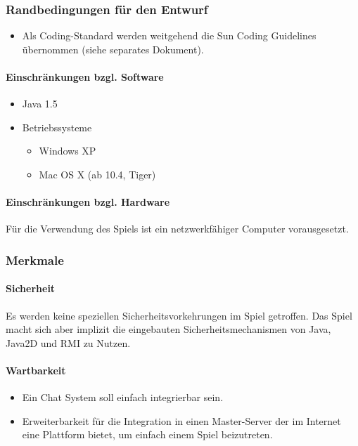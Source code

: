 \documentclass[a4paper,12pt,halfparskip,DIV14]{scrartcl}
\begin{document}
\subsubsection{Randbedingungen für den Entwurf}\label{ssub:randbedingungen_für_den_entwurf} %
\begin{itemize}
	\item Als Coding-Standard werden weitgehend die Sun Coding Guidelines übernommen (siehe separates Dokument).
\end{itemize}
\paragraph{Einschränkungen bzgl. Software}\label{ssub:einschränkungen_bzgl_software} %
\begin{itemize}
	\item Java 1.5
	\item Betriebssysteme
	\begin{itemize}
		\item Windows XP
		\item 	Mac OS X (ab 10.4, Tiger)
	\end{itemize}
\end{itemize}
\paragraph{Einschränkungen bzgl. Hardware}\label{ssub:einschränkungen_bzgl_hardware} %
Für die Verwendung des Spiels ist ein netzwerkfähiger Computer vorausgesetzt.

\subsubsection{Merkmale}\label{ssub:merkmale} %
\paragraph{Sicherheit}\label{ssub:sicherheit} %
Es werden keine speziellen Sicherheitsvorkehrungen im Spiel getroffen. Das Spiel macht sich aber implizit die eingebauten Sicherheitsmechanismen von Java, Java2D und RMI zu Nutzen.
\paragraph{Wartbarkeit}\label{ssub:wartbarkeit} %
\begin{itemize}
	\item Ein Chat System soll einfach integrierbar sein.
	\item Erweiterbarkeit für die Integration in einen  Master-Server der im Internet eine Plattform bietet, um einfach einem Spiel beizutreten.
\end{itemize}
\end{document}
